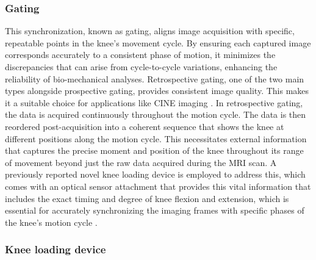 \documentclass{micro-econ-thesis}
\begin{document}
\subsubsection{Gating} 

This synchronization, known as gating, aligns image acquisition with specific, repeatable points in the knee's movement cycle. By ensuring each captured image corresponds accurately to a consistent phase of motion, it minimizes the discrepancies that can arise from cycle-to-cycle variations, enhancing the reliability of bio-mechanical analyses. Retrospective gating, one of the two main types alongside prospective gating, provides consistent image quality. This makes it a suitable choice for applications like CINE imaging \parencite[p. 102]{edelman_clinical_1996}. In retrospective gating, the data is acquired continuously throughout the motion cycle. The data is then reordered post-acquisition into a coherent sequence that shows the knee at different positions along the motion cycle. This necessitates external information that captures the precise moment and position of the knee throughout its range of movement beyond just the raw data acquired during the MRI scan. A previously reported novel knee loading device is employed to address this, which comes with an optical sensor attachment that provides this vital information that includes the exact timing and degree of knee flexion and extension, which is essential for accurately synchronizing the imaging frames with specific phases of the knee’s motion cycle \parencite{brisson_novel_2022}. 

\subsubsection{Knee loading device }
\end{document}
